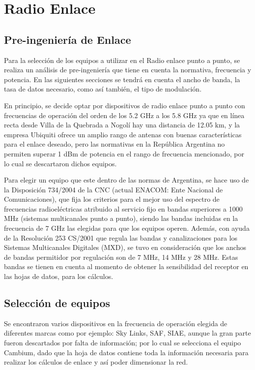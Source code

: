 \documentclass[12pt,a4paper]{book}
\begin{document}
\section{Radio Enlace}

\subsection{Pre-ingeniería de Enlace}

Para la selección de los equipos a utilizar en el Radio enlace punto a punto, se realiza un análisis de pre-ingeniería que tiene en cuenta la normativa, frecuencia y potencia. En las siguientes secciones se tendrá en cuenta el ancho de banda, la tasa de datos necesario, como así también, el tipo de modulación.

En principio, se decide optar por dispositivos de radio enlace punto a punto con frecuencias de operación del orden de los 5.2 GHz a los 5.8 GHz ya que en línea recta desde Villa de la Quebrada a Nogolí hay una distancia de 12.05 km, y la empresa Ubiquiti ofrece un amplio rango de antenas con buenas características para el enlace deseado, pero las normativas en la República Argentina no permiten superar 1 dBm de potencia en el rango de frecuencia mencionado, por lo cual se descartaron dichos equipos.

Para elegir un equipo que este dentro de las normas de Argentina, se hace uso de la Disposición 734/2004 de la CNC (actual ENACOM: Ente Nacional de Comunicaciones), que fija los criterios para el mejor uso del espectro de frecuencias radioeléctricas atribuido al servicio fijo en bandas superiores a 1000 MHz (sistemas multicanales punto a punto), siendo las bandas incluidas en la frecuencia de 7 GHz las elegidas para que los equipos operen. Además, con ayuda de la Resolución 253 CS/2001 que regula las bandas y canalizaciones para los Sistemas Multicanales Digitales (MXD), se tuvo en consideración que los anchos de bandas permitidor por regulación son de 7 MHz, 14 MHz y 28 MHz. Estas bandas se tienen en cuenta al momento de obtener la sensibilidad del receptor en las hojas de datos, para los cálculos.


\subsection{Selección de equipos}

Se encontraron varios dispositivos en la frecuencia de operación elegida de diferentes marcas como por ejemplo: Sky Links, SAF, SIAE, aunque la gran parte fueron descartados por falta de información; por lo cual se selecciona el equipo Cambium, dado que la hoja de datos contiene toda la información necesaria para realizar los cálculos de enlace y así poder dimensionar la red.
\end{document}
